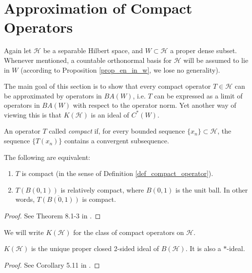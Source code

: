 \documentclass[12pt]{article}
\begin{document}


\section{Approximation of Compact Operators} %


Again let $\mathcal{H}$ be a separable Hilbert space, and $W\subset\mathcal{H}$ a proper dense subset. Whenever mentioned, a countable orthonormal basis for $\mathcal{H}$ will be assumed to lie in $W$ (according to Proposition \ref{prop_en_in_w}, we lose no generality).  

The main goal of this section is to show that every compact operator $T\in\mathcal{H}$ can be approximated by operators in $BA(W)$, i.e. $T$ can be expressed as a limit of operators in $BA(W)$ with respect to the operator norm. Yet another way of viewing this is that $K(\mathcal{H})$ is an ideal of $C^\ast(W)$.

\begin{definition}
\label{def_compact_operator}
	An operator $T$ called \emph{compact} if, for every bounded sequence $\{x_n\}\subset\mathcal{H}$, the sequence $\{T(x_n)\}$ contains a convergent subsequence.
\end{definition}

\begin{proposition}
\label{prop_equiv_compact_defs}
	The following are equivalent:
	\begin{enumerate}
		\item $T$ is compact (in the sense of Definition \ref{def_compact_operator}).
		\item $T(B(0,1))$ is relatively compact, where $B(0,1)$ is the unit ball. In other words, $\overline{T(B(0,1))}$ is compact.
	\end{enumerate}
\end{proposition}
\begin{proof}
	See Theorem 8.1-3 in \cite{kreyszig_1989}.
\end{proof}

We will write $K(\mathcal{H})$ for the class of compact operators on $\mathcal{H}$.

\begin{proposition}
\label{prop_compact_ideal}
	$K(\mathcal{H})$ is the unique proper closed 2-sided ideal of $B(\mathcal{H})$. It is also a $\ast$-ideal.
\end{proposition}
\begin{proof}
	See Corollary 5.11 in \cite{douglas_1998}.
\end{proof}
\end{document}
